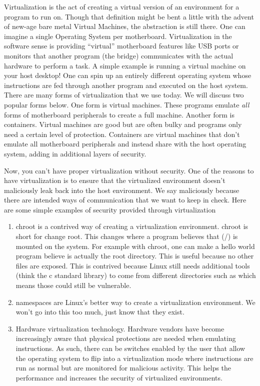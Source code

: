 Virtualization is the act of creating a virtual version of an environment for a program to run on.
Though that definition might be bent a little with the advent of new-age bare metal Virtual Machines, the abstraction is still there.
One can imagine a single Operating System per motherboard.
Virtualization in the software sense is providing ``virtual'' motherboard features like USB ports or monitors that another program (the bridge) communicates with the actual hardware to perform a task.
A simple example is running a virtual machine on your host desktop!
One can spin up an entirely different operating system whose instructions are fed through another program and executed on the host system.
There are many forms of virtualization that we use today. We will discuss two popular forms below.
One form is virtual machines.
These programs emulate \textit{all} forms of motherboard peripherals to create a full machine.
Another form is containers.
Virtual machines are good but are often bulky and programs only need a certain level of protection.
Containers are virtual machines that don't emulate all motherboard peripherals and instead share with the host operating system, adding in additional layers of security.

Now, you can't have proper virtualization without security.
One of the reasons to have virtualization is to ensure that the virtualized environment doesn't maliciously leak back into the host environment.
We say maliciously because there are intended ways of communication that we want to keep in check.
Here are some simple examples of security provided through virtualization

\begin{enumerate}
\item chroot is a contrived way of creating a virtualization environment.
  chroot is short for change root.
  This changes where a program believes that (/) is mounted on the system.
  For example with chroot, one can make a hello world program believe  is actually the root directory.
  This is useful because no other files are exposed.
  This is contrived because Linux still needs additional tools (think the c standard library) to come from different directories such as  which means those could still be vulnerable.
\item namespaces are Linux's better way to create a virtualization environment.
  We won't go into this too much, just know that they exist.
\item Hardware virtualization technology.
  Hardware vendors have become increasingly aware that physical protections are needed when emulating instructions.
  As such, there can be switches enabled by the user that allow the operating system to flip into a virtualization mode where instructions are run as normal but are monitored for malicious activity.
  This helps the performance and increases the security of virtualized environments.
\end{enumerate}

